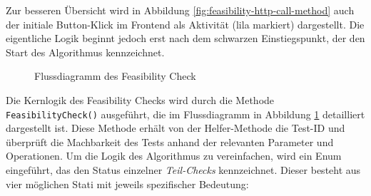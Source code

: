 Zur besseren Übersicht wird in Abbildung \ref{fig:feasibility-http-call-method} auch der initiale Button-Klick im Frontend als Aktivität (lila markiert) dargestellt. Die eigentliche Logik beginnt jedoch erst nach dem schwarzen Einstiegspunkt, der den Start des Algorithmus kennzeichnet.

\begin{figure}[!htbp]
    \centering
    \caption{Flussdiagramm des Feasibility Check}
    \label{fig:feasibility-check}
\end{figure}

Die Kernlogik des Feasibility Checks wird durch die Methode \texttt{FeasibilityCheck()} ausgeführt, die im Flussdiagramm in Abbildung \ref{fig:feasibility-check} detailliert dargestellt ist. Diese Methode erhält von der Helfer-Methode die Test-ID und überprüft die Machbarkeit des Tests anhand der relevanten Parameter und Operationen. Um die Logik des Algorithmus zu vereinfachen, wird ein Enum eingeführt, das den Status einzelner \textit{Teil-Checks} kennzeichnet. Dieser besteht aus vier möglichen Stati mit jeweils spezifischer Bedeutung:

